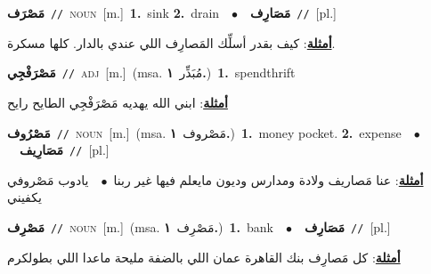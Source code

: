 \documentclass[10pt,a4paper,twoside]{article} %
\begin{document}
\begin{multicols}{2}
{\setlength\topsep{0pt}\textbf{\foreignlanguage{arabic}{مَصْرَف}}\ {\color{gray}\texttt{//}\color{black}}\ \textsc{noun}\ [m.]\ \textbf{1.}~sink  \textbf{2.}~drain\ \ $\bullet$\ \ \setlength\topsep{0pt}\textbf{\foreignlanguage{arabic}{مَصَارِف}}\ {\color{gray}\texttt{//}\color{black}}\ [pl.]\  \begin{flushright}\color{gray}\foreignlanguage{arabic}{\textbf{\underline{\foreignlanguage{arabic}{أمثلة}}}: كيف بقدر أسلِّك المَصارِف اللي عندي بالدار. كلها مسكرة.}\end{flushright}\color{black}} \vspace{2mm}

{\setlength\topsep{0pt}\textbf{\foreignlanguage{arabic}{مَصْرَفْجِي}}\ {\color{gray}\texttt{//}\color{black}}\ \textsc{adj}\ [m.]\ \color{gray}(msa. \foreignlanguage{arabic}{مُبَذِّر}~\foreignlanguage{arabic}{\textbf{١.}})\color{black}\ \textbf{1.}~spendthrift\  \begin{flushright}\color{gray}\foreignlanguage{arabic}{\textbf{\underline{\foreignlanguage{arabic}{أمثلة}}}: ابني الله يهديه مَصْرَفْجِي الطايح رايح}\end{flushright}\color{black}} \vspace{2mm}

{\setlength\topsep{0pt}\textbf{\foreignlanguage{arabic}{مَصْرُوف}}\ {\color{gray}\texttt{//}\color{black}}\ \textsc{noun}\ [m.]\ \color{gray}(msa. \foreignlanguage{arabic}{مَصْروف}~\foreignlanguage{arabic}{\textbf{١.}})\color{black}\ \textbf{1.}~money pocket.  \textbf{2.}~expense\ \ $\bullet$\ \ \setlength\topsep{0pt}\textbf{\foreignlanguage{arabic}{مَصَارِيف}}\ {\color{gray}\texttt{//}\color{black}}\ [pl.]\  \begin{flushright}\color{gray}\foreignlanguage{arabic}{\textbf{\underline{\foreignlanguage{arabic}{أمثلة}}}: عنا مَصاريف ولادة ومدارس وديون مايعلم فيها غير ربنا\ $\bullet$\ \  يادوب مَصْروفي يكفيني}\end{flushright}\color{black}} \vspace{2mm}

{\setlength\topsep{0pt}\textbf{\foreignlanguage{arabic}{مَصْرِف}}\ {\color{gray}\texttt{//}\color{black}}\ \textsc{noun}\ [m.]\ \color{gray}(msa. \foreignlanguage{arabic}{مَصْرِف}~\foreignlanguage{arabic}{\textbf{١.}})\color{black}\ \textbf{1.}~bank\ \ $\bullet$\ \ \setlength\topsep{0pt}\textbf{\foreignlanguage{arabic}{مَصَارِف}}\ {\color{gray}\texttt{//}\color{black}}\ [pl.]\  \begin{flushright}\color{gray}\foreignlanguage{arabic}{\textbf{\underline{\foreignlanguage{arabic}{أمثلة}}}: كل مَصارِف بنك القاهرة عمان اللي بالضفة مليحة ماعدا اللي بطولكرم}\end{flushright}\color{black}} \vspace{2mm}


\end{multicols}
\end{document}
